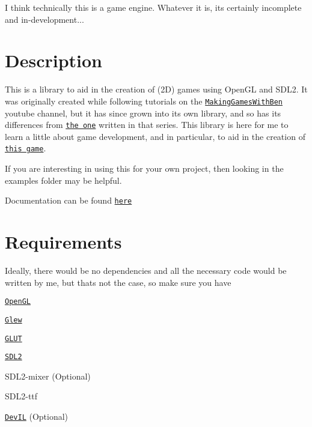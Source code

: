 I think technically this is a game engine. Whatever it is, it\textquotesingle{}s certainly incomplete and in-\/development...

\section*{Description}

This is a library to aid in the creation of (2D) games using Open\+GL and S\+D\+L2. It was originally created while following tutorials on the \href{https://www.youtube.com/channel/UCL5m1_llmeiAdZMo_ZanIvg}{\tt Making\+Games\+With\+Ben} youtube channel, but it has since grown into its own library, and so has its differences from \href{https://github.com/Barnold1953/GraphicsTutorials}{\tt the one} written in that series. This library is here for me to learn a little about game development, and in particular, to aid in the creation of \href{https://github.com/NivenT/Planet}{\tt this game}.

If you are interesting in using this for your own project, then looking in the {\ttfamily examples} folder may be helpful.

Documentation can be found \href{https://nivent.github.io/jubilant-funicular/html/index.html}{\tt here}

\section*{Requirements}

Ideally, there would be no dependencies and all the necessary code would be written by me, but that\textquotesingle{}s not the case, so make sure you have


\begin{DoxyItemize}
\item \href{https://www.opengl.org/}{\tt Open\+GL}
\begin{DoxyItemize}
\item \href{http://glew.sourceforge.net/}{\tt Glew}
\item \href{http://freeglut.sourceforge.net/}{\tt G\+L\+UT}
\end{DoxyItemize}
\item \href{https://www.libsdl.org/download-2.0.php}{\tt S\+D\+L2}
\begin{DoxyItemize}
\item S\+D\+L2-\/mixer (Optional)
\item S\+D\+L2-\/ttf
\end{DoxyItemize}
\item \href{http://openil.sourceforge.net/}{\tt Dev\+IL} (Optional)
\end{DoxyItemize}


